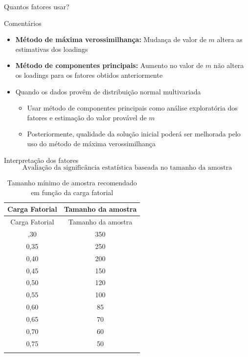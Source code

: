 \documentclass[
  ignorenonframetext,
  aspectratio=169,
]{beamer}
\providecommand{\tightlist}{%
  \setlength{\itemsep}{0pt}\setlength{\parskip}{0pt}}
\begin{document}
\begin{frame}{Quantos fatores usar?}
\label{quantos-fatores-usar-2}
\begin{block}{Comentários}
\label{comentuxe1rios-2}
\begin{itemize}
\tightlist
\item
  \textbf{Método de máxima verossimilhança:} Mudança de valor de \(m\)
  altera as estimativas dos loadings
\end{itemize}

\vspace{0.5cm}

\begin{itemize}
\tightlist
\item
  \textbf{Método de componentes principais:} Aumento no valor de \(m\)
  não altera os loadings para os fatores obtidos anteriormente
\end{itemize}

\vspace{0.5cm}

\begin{itemize}
\tightlist
\item
  Quando os dados provêm de distribuição normal multivariada

  \begin{itemize}
  \tightlist
  \item
    Usar método de componentes principais como análise exploratória dos
    fatores e estimação do valor provável de \(m\)
  \item
    Posteriormente, qualidade da solução inicial poderá ser melhorada
    pelo uso do método de máxima verossimilhança
  \end{itemize}
\end{itemize}
\end{block}
\end{frame}

\begin{frame}{Interpretação dos fatores}
\label{interpretauxe7uxe3o-dos-fatores}
\[\text{Avaliação da significância estatística baseada no tamanho da amostra}\]

\begin{longtable}[]{@{}cc@{}}
\caption{Tamanho mínimo de amostra recomendado em função da carga
fatorial}\tabularnewline
\toprule\noalign{}
Carga Fatorial & Tamanho da amostra \\
\midrule\noalign{}
\endfirsthead
\toprule\noalign{}
Carga Fatorial & Tamanho da amostra \\
\midrule\noalign{}
\endhead
0,30 & 350 \\
0,35 & 250 \\
0,40 & 200 \\
0,45 & 150 \\
0,50 & 120 \\
0,55 & 100 \\
0,60 & 85 \\
0,65 & 70 \\
0,70 & 60 \\
0,75 & 50 \\
\bottomrule\noalign{}
\end{longtable}
\end{frame}
\end{document}
